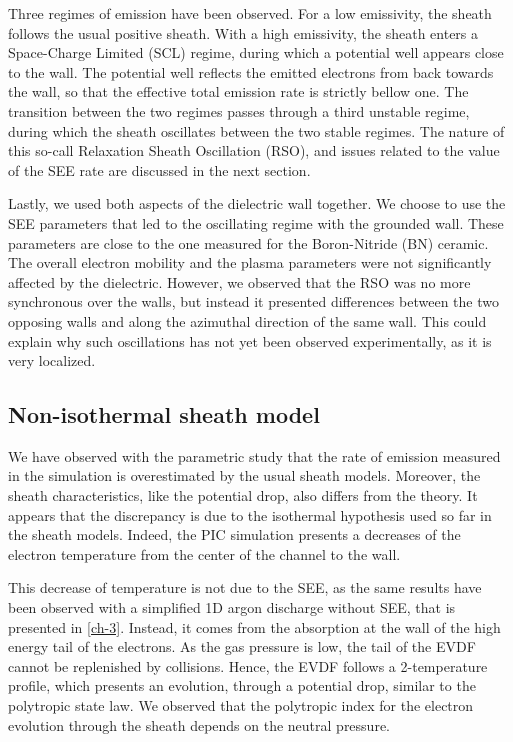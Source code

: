 Three regimes of emission have been observed.
For a low emissivity, the sheath follows the usual positive sheath.
With a high emissivity, the sheath enters a Space-Charge Limited (SCL) regime, during which a potential well appears close to the wall.
The potential well reflects the emitted electrons from back towards the wall, so that the effective total emission rate is strictly bellow one.
The transition between the two regimes passes through a third unstable regime, during which the sheath oscillates between the two stable regimes.
The nature of this so-call Relaxation Sheath Oscillation (RSO), and issues related to the value of the SEE rate are discussed in the next section.

Lastly, we used both aspects of the dielectric wall together.
We choose to use the SEE parameters that led to the oscillating regime with the grounded wall.
These parameters are close to the one measured for the Boron-Nitride (BN) ceramic.
The overall electron mobility and the plasma parameters were not significantly affected by the dielectric.
However, we observed that the RSO was no more synchronous over the walls, but instead it presented differences between the two opposing walls and along the azimuthal direction of the same wall.
This could explain why such oscillations has not yet been observed experimentally, as it is very localized.

\subsection{Non-isothermal sheath model}

We have observed with the parametric study that the rate of emission measured in the simulation is overestimated by the usual sheath models.
Moreover, the sheath characteristics, like the potential drop, also differs from the theory.
It appears that the discrepancy is due to the isothermal hypothesis used so far in the sheath models.
Indeed, the PIC simulation presents a decreases of the electron temperature from the center of the channel to the wall.

This decrease of temperature is not due to the SEE, as the same results have been observed with a simplified 1D argon discharge without SEE, that is presented in \cref{ch-3}.
Instead, it comes from the absorption at the wall of the high energy tail of the electrons.
As the gas pressure is low, the tail of the EVDF cannot be replenished by collisions.
Hence, the EVDF follows a 2-temperature profile, which presents an evolution, through a potential drop, similar to the polytropic state law. 
We observed that the polytropic index for the electron evolution through the sheath depends on the neutral pressure.


